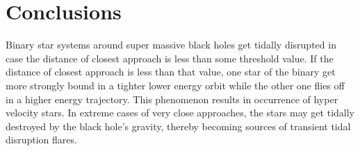 \documentclass[a4paper]{article}
\begin{document}
\begin{enumerate} [label*=\textbf{(\alph*)}]
					
			\end{enumerate}



		\section{Conclusions} \label{3:conclusions}
		Binary star systems around super massive black holes get tidally disrupted in case the distance of closest approach is less than some threshold value. If the distance of closest approach is less than that value, one star of the binary get more strongly bound in a tighter lower energy orbit while the other one flies off in a higher energy trajectory. This phenomenon results in occurrence of hyper velocity stars. In extreme cases of very close approaches, the stars may get tidally destroyed by the black hole's gravity, thereby becoming sources of transient tidal disruption flares.
		
\end{document}
